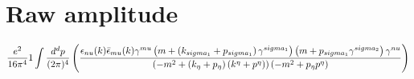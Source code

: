 \section*{Raw amplitude}
\begin{dmath}\frac{e^{2}}{16 \pi^{4}}1\int\frac{d^d p }{ (2\pi)^4 }\left(\frac{\epsilon_{ \\nu }({ k }) \bar{\epsilon}_{ \\mu }({ k }) { \gamma^{ \\mu } } \left(m + \left({ { k }_{ \\sigma_1 } } + { { p }_{ \\sigma_1 } }\right) { \gamma^{ \\sigma_1 } }\right) \left(m + { { p }_{ \\sigma_1 } } { \gamma^{ \\sigma_2 } }\right) { \gamma^{ \\nu } }}{\left(- m^{2} + \left({ { k }_{ \eta } } + { { p }_{ \eta } }\right) \left({ { k }^{ \eta } } + { { p }^{ \eta } }\right)\right) \left(- m^{2} + { { p }_{ \eta } } { { p }^{ \eta } }\right)}\right)\end{dmath}
